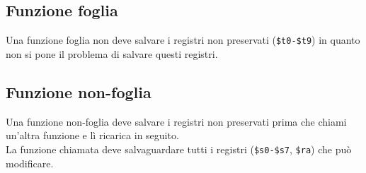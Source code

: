 \documentclass[../main.tex]{subfiles}
\begin{document}
\subsection{Funzione foglia}
Una funzione foglia non deve salvare i registri non preservati
(\texttt{\$t0-\$t9}) in quanto non si pone il problema di salvare
questi registri.

\subsection{Funzione non-foglia}
Una funzione non-foglia deve salvare i registri non preservati prima che
chiami un'altra funzione e lì ricarica in seguito. \\[1mm]
La funzione chiamata deve salvaguardare tutti i registri (\texttt{\$s0-\$s7}, \texttt{\$ra})
che può modificare.
\end{document}

